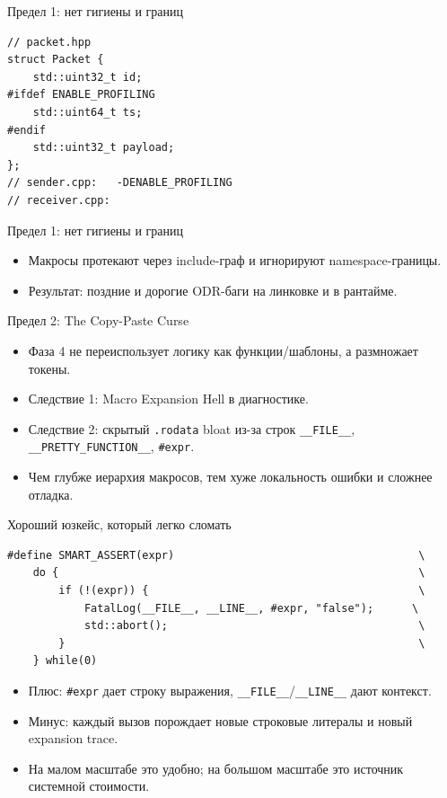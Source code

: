 \documentclass{beamer}
\begin{document}
\begin{frame}[fragile]{Предел 1: нет гигиены и границ}
\begin{lstlisting}
// packet.hpp
struct Packet {
    std::uint32_t id;
#ifdef ENABLE_PROFILING
    std::uint64_t ts;
#endif
    std::uint32_t payload;
};
// sender.cpp:   -DENABLE_PROFILING
// receiver.cpp:
\end{lstlisting}
\end{frame}

\begin{frame}[fragile]{Предел 1: нет гигиены и границ}
    \begin{itemize}
        \item Макросы протекают через include-граф и игнорируют namespace-границы.
        \item Результат: поздние и дорогие ODR-баги на линковке и в рантайме.
    \end{itemize}
\end{frame}

\begin{frame}{Предел 2: The Copy-Paste Curse}
    \begin{itemize}
        \item Фаза 4 не переиспользует логику как функции/шаблоны, а размножает токены.
        \item Следствие 1: Macro Expansion Hell в диагностике.
        \item Следствие 2: скрытый \texttt{.rodata} bloat из-за строк \texttt{\_\_FILE\_\_}, \texttt{\_\_PRETTY\_FUNCTION\_\_}, \texttt{\#expr}.
        \item Чем глубже иерархия макросов, тем хуже локальность ошибки и сложнее отладка.
    \end{itemize}
\end{frame}

\begin{frame}[fragile]{Хороший юзкейс, который легко сломать}
\begin{lstlisting}
#define SMART_ASSERT(expr)                                      \
    do {                                                        \
        if (!(expr)) {                                          \
            FatalLog(__FILE__, __LINE__, #expr, "false");      \
            std::abort();                                       \
        }                                                       \
    } while(0)
\end{lstlisting}
    \begin{itemize}
        \item Плюс: \texttt{\#expr} дает строку выражения, \texttt{\_\_FILE\_\_}/\texttt{\_\_LINE\_\_} дают контекст.
        \item Минус: каждый вызов порождает новые строковые литералы и новый expansion trace.
        \item На малом масштабе это удобно; на большом масштабе это источник системной стоимости.
    \end{itemize}
\end{frame}
\end{document}
